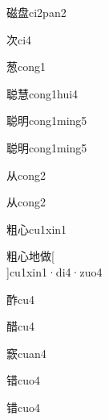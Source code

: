 \begin{verbete}[14;11]{磁盘}{ci2pan2}
\end{verbete}

\begin{verbete}[6]{次}{ci4}
\end{verbete}

\begin{verbete}[12]{葱}{cong1}
\end{verbete}

\begin{verbete}[15;15]{聪慧}{cong1hui4}
\end{verbete}

\begin{verbete}[15;8]{聪明}{cong1ming5}
\end{verbete}

\begin{verbete}[15;8]{聪明}{cong1ming5}
\end{verbete}

\begin{verbete}[4]{从}{cong2}
\end{verbete}
\begin{verbete*}[4]{从}{cong2}
\end{verbete*}

\begin{verbete}[11;4]{粗心}{cu1xin1}
\end{verbete}

\begin{verbete}[11;4;6;11]{粗心地做}[\\]{cu1xin1·di4·zuo4}
\end{verbete}

\begin{verbete}[12]{酢}{cu4}
\end{verbete}

\begin{verbete}[15]{醋}{cu4}
\end{verbete}

\begin{verbete}[17]{窾}{cuan4}
\end{verbete}

\begin{verbete}[13]{错}{cuo4}
\end{verbete}
\begin{verbete*}[13]{错}{cuo4}
\end{verbete*}


